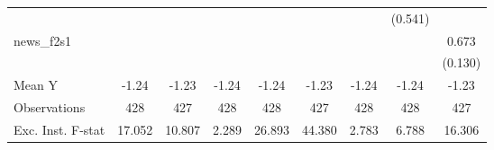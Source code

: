 {\begin{tabular}{l*{8}{c}}
            &                     &                     &                     &                     &                     &                     &     (0.541)         &                     \\
\addlinespace
news\_f2s1   &                     &                     &                     &                     &                     &                     &                     &       0.673\sym{***}\\
            &                     &                     &                     &                     &                     &                     &                     &     (0.130)         \\
\midrule
Mean Y      &       -1.24         &       -1.23         &       -1.24         &       -1.24         &       -1.23         &       -1.24         &       -1.24         &       -1.23         \\
Observations&         428         &         427         &         428         &         428         &         427         &         428         &         428         &         427         \\
Exc. Inst. F-stat&      17.052         &      10.807         &       2.289         &      26.893         &      44.380         &       2.783         &       6.788         &      16.306         \\
\bottomrule
\end{tabular}
}
